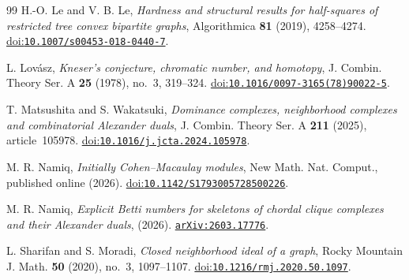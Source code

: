 \documentclass[11pt]{amsart}
\theoremstyle{definition}
\theoremstyle{remark}
\numberwithin{equation}{section}
\begin{document}
\begin{thebibliography}{99}
		H.-O. Le and V. B. Le,
		\emph{Hardness and structural results for half-squares of restricted tree convex bipartite graphs},
		Algorithmica \textbf{81} (2019), 4258--4274.
		\href{https://doi.org/10.1007/s00453-018-0440-7}{doi:\nolinkurl{10.1007/s00453-018-0440-7}}.
		
		L. Lov\'asz,
		\emph{Kneser's conjecture, chromatic number, and homotopy},
		J. Combin. Theory Ser. A \textbf{25} (1978), no.~3, 319--324.
		\href{https://doi.org/10.1016/0097-3165(78)90022-5}{doi:\nolinkurl{10.1016/0097-3165(78)90022-5}}.
		
		T. Matsushita and S. Wakatsuki,
		\emph{Dominance complexes, neighborhood complexes and combinatorial Alexander duals},
		J. Combin. Theory Ser. A \textbf{211} (2025), article~105978.
		\href{https://doi.org/10.1016/j.jcta.2024.105978}{doi:\nolinkurl{10.1016/j.jcta.2024.105978}}.
		
		M. R. Namiq,
		\emph{Initially Cohen--Macaulay modules},
		New Math. Nat. Comput., published online (2026).
		\href{https://doi.org/10.1142/S1793005728500226}{doi:\nolinkurl{10.1142/S1793005728500226}}.
		
		M. R. Namiq,
		\emph{Explicit Betti numbers for skeletons of chordal clique complexes and their Alexander duals}, (2026).
		\href{https://arxiv.org/abs/2603.17776}{\nolinkurl{arXiv:2603.17776}}.
		
		L. Sharifan and S. Moradi,
		\emph{Closed neighborhood ideal of a graph},
		Rocky Mountain J. Math. \textbf{50} (2020), no.~3, 1097--1107.
		\href{https://doi.org/10.1216/rmj.2020.50.1097}{doi:\nolinkurl{10.1216/rmj.2020.50.1097}}.
		
	\end{thebibliography}
	\endgroup
	
\end{document}
